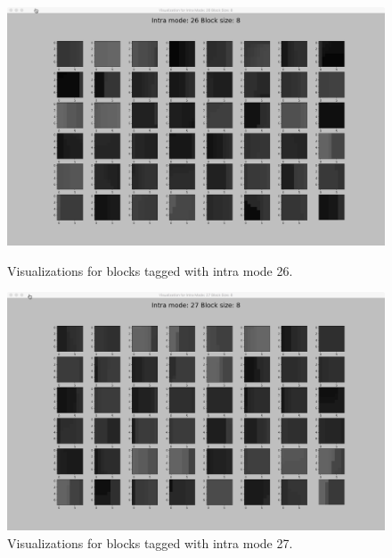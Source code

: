 \begin{figure}
        \vspace*{1cm} %
    
        \begin{minipage}{0.49\textwidth}
            \includegraphics[width=\linewidth]{Figures/visu-size8x8/8-26}
            \caption[Visualizations for blocks tagged with intra mode 26]{Visualizations for blocks tagged with intra mode 26.}
            \label{fig:size8_mode26}
        \end{minipage}
        \hspace{\fill} %
        \begin{minipage}{0.49\textwidth}
            \includegraphics[width=\linewidth]{Figures/visu-size8x8/8-27}
            \caption[Visualizations for blocks tagged with intra mode 27]{Visualizations for blocks tagged with intra mode 27.}
            \label{fig:size8_mode27}
        \end{minipage}
    \end{figure}
    
